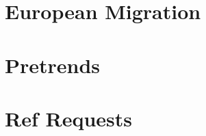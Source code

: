 \documentclass{article}
\begin{document}
\clearpage
\begin{table}
\footnotesize
\centering
\caption{Main Table, All Controls From Balance Table}
\begin{threeparttable}
\footnotesize

\end{threeparttable}
\label{tab:log_effect}
\end{table}
\clearpage

\section{European Migration}
\begin{table}
\footnotesize
\centering
\caption{Euro mig}
\begin{threeparttable}
\footnotesize

\end{threeparttable}
\label{tab:mig_new}
\end{table}
\clearpage


\section*{Pretrends}


\begin{table}
\footnotesize
\centering
\caption{Pretrends, Imbalanced Controls}
\begin{threeparttable}
\footnotesize

\end{threeparttable}
\label{tab:mig_new}
\end{table}
\clearpage


\section*{Ref Requests}

\clearpage
\begin{table}
\footnotesize
\centering
\caption{Ref Request 1: Log Differences}
\begin{threeparttable}
\footnotesize

\end{threeparttable}
\label{tab:log_effect}
\end{table}
\clearpage

\clearpage
\begin{table}
\footnotesize
\centering
\caption{Ref Request 2: Pct Outcome}
\begin{threeparttable}
\footnotesize

\end{threeparttable}
\label{tab:log_effect}
\end{table}
\clearpage
\end{document}
